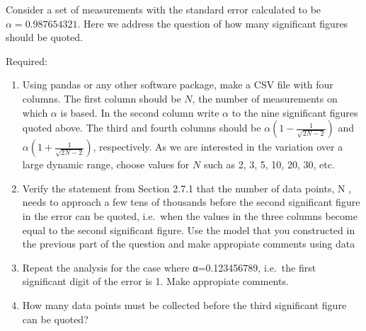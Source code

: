 \documentclass[11pt]{article}
\providecommand{\tightlist}{%
      \setlength{\itemsep}{0pt}\setlength{\parskip}{0pt}}
\begin{document}
Consider a set of measurements with the standard error calculated to be
\(\alpha=0.987654321\). Here we address the question of how many
significant figures should be quoted.

Required:

\begin{enumerate}
\def\labelenumi{(\roman{enumi})}
\tightlist
\item
  Using pandas or any other software package, make a CSV file with four
  columns. The first column should be \(N\), the number of measurements
  on which \(\alpha\) is based. In the second column write \(\alpha\) to
  the nine significant figures quoted above. The third and fourth
  columns should be
  \({\displaystyle \alpha\left(1-\frac{1}{\sqrt{2N-2}}\right)}\) and
  \({\displaystyle \alpha\left(1+\frac{1}{\sqrt{2N-2}}\right)}\),
  respectively. As we are interested in the variation over a large
  dynamic range, choose values for \(N\) such as 2, 3, 5, 10, 20, 30,
  etc. 
\item
  Verify the statement from Section 2.7.1 that the number of data
  points, N , needs to approach a few tens of thousands before the
  second significant figure in the error can be quoted, i.e.~when the
  values in the three columns become equal to the second significant
  figure. Use the model that you constructed in the previous part of the
  question and make appropiate comments using data 
\item
  Repeat the analysis for the case where α=0.123456789, i.e.~the first
  significant digit of the error is 1. Make appropiate comments. 
\item
  How many data points must be collected before the third significant
  figure can be quoted?
\end{enumerate}
\end{document}
